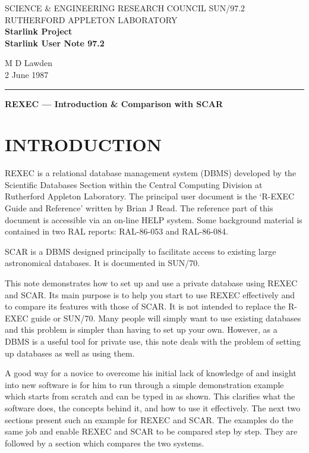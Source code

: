\setlength{\textwidth}{153mm}
\setlength{\textheight}{220mm}
\setlength{\oddsidemargin}{3mm}
\setlength{\evensidemargin}{3mm}
\pagestyle{myheadings}


\thispagestyle{plain}
\noindent
SCIENCE \& ENGINEERING RESEARCH COUNCIL \hfill SUN/97.2\\
RUTHERFORD APPLETON LABORATORY\\
{\large\bf Starlink Project\\}
{\large\bf Starlink User Note 97.2}
\begin{flushright}
M D Lawden\\
2 June 1987
\end{flushright}
\vspace{-4mm}
\rule{\textwidth}{0.5mm}
\vspace{10mm}
\begin{center}
{\Large\bf REXEC --- Introduction \& Comparison with SCAR}
\end{center}
\vspace{10mm}
\section {INTRODUCTION}
REXEC is a relational database management system (DBMS) developed by the
Scientific Databases Section within the Central Computing Division at Rutherford
Appleton Laboratory.
The principal user document is the `R-EXEC Guide and Reference' written by
Brian J Read.
The reference part of this document is accessible via an on-line HELP system.
Some background material is contained in two RAL reports: RAL-86-053 and
RAL-86-084.

SCAR is a DBMS designed principally to facilitate access to existing large
astronomical databases.
It is documented in SUN/70.

This note demonstrates how to set up and use a private database using REXEC
and SCAR.
Its main purpose is to help you start to use REXEC effectively and to compare
its features with those of SCAR.
It is not intended to replace the R-EXEC guide or SUN/70.
Many people will simply want to use existing databases and this problem is
simpler than having to set up your own.
However, as a DBMS is a useful tool for private use, this note deals with
the problem of setting up databases as well as using them.

A good way for a novice to overcome his initial lack of knowledge of and
insight into new software is for him to run through a simple demonstration
example which starts from scratch and can be typed in as shown.
This clarifies what the software does, the concepts behind it, and how to use it
effectively.
The next two sections present such an example for REXEC and SCAR.
The examples do the same job and enable REXEC and SCAR to be compared step by
step.
They are followed by a section which compares the two systems.

